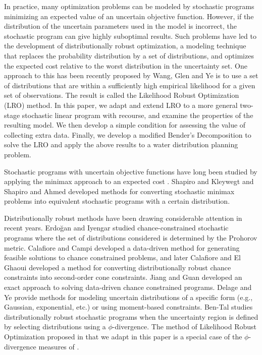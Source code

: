 \documentclass[11pt]{article}
\begin{document}
In practice, many optimization problems can be modeled by stochastic programs minimizing an expected value of an uncertain objective function.
However, if the distribution of the uncertain parameters used in the model is incorrect, the stochastic program can give highly suboptimal results.
Such problems have led to the development of distributionally robust optimization, a modeling technique that replaces the probability distribution by a set of distributions, and optimizes the expected cost relative to the worst distribution in the uncertainty set.
One approach to this has been recently proposed by Wang, Glen and Ye \cite{wang2010likelihood} is to use a set of distributions that are within a sufficiently high empirical likelihood for a given set of observations.
The result is called the Likelihood Robust Optimization (LRO) method.
In this paper, we adapt and extend LRO to a more general two-stage stochastic linear program with recourse, and examine the properties of the resulting model.
We then develop a simple condition for assessing the value of collecting extra data.
Finally, we develop a modified Bender's Decomposition to solve the LRO and apply the above results to a water distribution planning problem.

Stochastic programs with uncertain objective functions have long been studied by applying the minimax approach to an expected cost \cite{dupacova_87}.
Shapiro and Kleywegt \cite{shapiro2002minimax} and Shapiro and Ahmed \cite{shapiro2004class} developed methods for converting stochastic minimax problems into equivalent stochastic programs with a certain distribution.

Distributionally robust methods have been drawing considerable attention in recent years.
Erdo{\u{g}}an and Iyengar \cite{erdogan2006ambiguous} studied chance-constrained stochastic programs where the set of distributions considered is determined by the Prohorov metric.
Calafiore and Campi \cite{calafiore2005uncertain} developed a data-driven method for generating feasible solutions to chance constrained problems, and later Calafiore and El Ghaoui \cite{calafiore2006distributionally} developed a method for converting distributionally robust chance constraints into second-order cone constraints.
Jiang and Guan \cite{jiang2012data} developed an exact approach to solving data-driven chance constrained programs.
Delage and Ye \cite{delage_ye_10} provide methods for modeling uncertain distributions of a specific form (e.g., Gaussian, exponential, etc.) or using moment-based constraints.
Ben-Tal \cite{bental2011robust} studies distributionally robust stochastic programs when the uncertainty region is defined by selecting distributions using a $\phi$-divergence.
The method of Likelihood Robust Optimization proposed in \cite{wang2010likelihood} that we adapt in this paper is a special case of the $\phi$-divergence measures of \cite{bental2011robust}.
\end{document}
